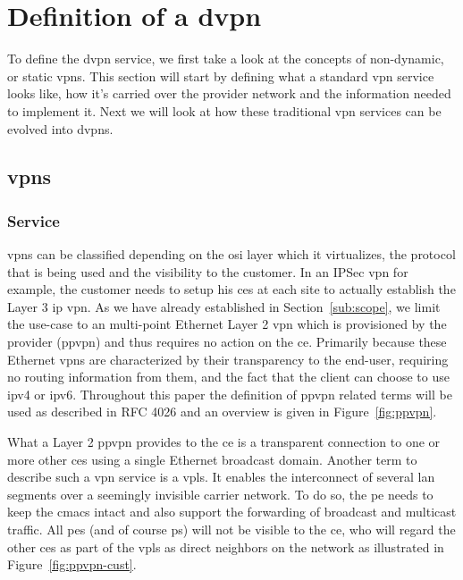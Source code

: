 \section{Definition of a \ac{dvpn}} %
\label{sec:dvpns}

To define the \ac{dvpn} service, we first take a look at the concepts of non-dynamic, or static \acp{vpn}. This section will start by defining what a standard \ac{vpn} service looks like, how it's carried over the provider network and the information needed to implement it. Next we will look at how these traditional \ac{vpn} services can be evolved into \aclp{dvpn}.

\subsection{\acsp{vpn}} %
\label{sub:vpn}

\subsubsection{Service} %
\label{ssub:service}

\acp{vpn} can be classified depending on the \acs{osi} layer which it virtualizes, the protocol that is being used and the visibility to the customer. In an IPSec \ac{vpn} for example, the customer needs to setup his \acp{ce} at each site to actually establish the Layer 3 \acs{ip} \ac{vpn}. As we have already established in Section~\ref{sub:scope}, we limit the use-case to an multi-point Ethernet Layer 2 \ac{vpn} which is provisioned by the provider (\acs{ppvpn}) and thus requires no action on the \ac{ce}. Primarily because these Ethernet \acp{vpn} are characterized by their transparency to the end-user, requiring no routing information from them, and the fact that the client can choose to use \acs{ip}v4 or \acs{ip}v6. Throughout this paper the definition of \ac{ppvpn} related terms will be used as described in RFC 4026 \cite{vpn-terms} and an overview is given in Figure~\ref{fig:ppvpn}.

What a Layer 2 \ac{ppvpn} provides to the \ac{ce} is a transparent connection to one or more other \acp{ce} using a single Ethernet broadcast domain. Another term to describe such a \ac{vpn} service is a \ac{vpls}. It enables the interconnect of several \acs{lan} segments over a seemingly invisible carrier network. To do so, the \ac{pe} needs to keep the \acp{cmac} intact and also support the forwarding of broadcast and multicast traffic. All \acp{pe} (and of course \acp{p}) will not be visible to the \ac{ce}, who will regard the other \acp{ce} as part of the \ac{vpls} as direct neighbors on the network as illustrated in Figure~\ref{fig:ppvpn-cust}. 

